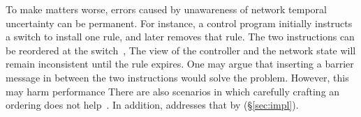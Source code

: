 To make matters worse, errors caused by unawareness of network temporal uncertainty can be permanent. 
For instance, a control program initially instructs a switch to install one rule, and later removes that rule.%
The two instructions can be reordered at the switch~\cite{verified-pldi13}, %
The view of the controller and the network state will remain inconsistent until the rule expires.
One may argue that inserting a barrier message in between the two instructions would solve the problem. 
However, this may harm performance  %
There are also scenarios in which carefully crafting an ordering does not help~\cite{Reitblatt2012}. In addition, %
\name addresses that by  (\S\ref{sec:impl}).

%


